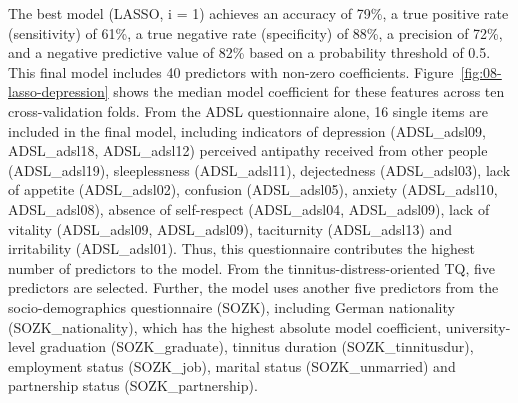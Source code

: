 \documentclass[
  oneside]{book}
\begin{document}
The best model (LASSO, i = 1) achieves an accuracy of 79\%, a true positive rate (sensitivity) of 61\%, a true negative rate (specificity) of 88\%, a precision of 72\%, and a negative predictive value of 82\% based on a probability threshold of 0.5.
This final model includes 40 predictors with non-zero coefficients.
Figure~\ref{fig:08-lasso-depression} shows the median model coefficient for these features across ten cross-validation folds.
From the ADSL questionnaire alone, 16 single items are included in the final model, including indicators of depression (ADSL\_adsl09, ADSL\_adsl18, ADSL\_adsl12) perceived antipathy received from other people (ADSL\_adsl19), sleeplessness (ADSL\_adsl11), dejectedness (ADSL\_adsl03), lack of appetite (ADSL\_adsl02), confusion (ADSL\_adsl05), anxiety (ADSL\_adsl10, ADSL\_adsl08), absence of self-respect (ADSL\_adsl04, ADSL\_adsl09), lack of vitality (ADSL\_adsl09, ADSL\_adsl09), taciturnity (ADSL\_adsl13) and irritability (ADSL\_adsl01).
Thus, this questionnaire contributes the highest number of predictors to the model. From the tinnitus-distress-oriented TQ, five predictors are selected.
Further, the model uses another five predictors from the socio-demographics questionnaire (SOZK), including German nationality (SOZK\_nationality), which has the highest absolute model coefficient, university-level graduation (SOZK\_graduate), tinnitus duration (SOZK\_tinnitusdur), employment status (SOZK\_job), marital status (SOZK\_unmarried) and partnership status (SOZK\_partnership).
\end{document}
